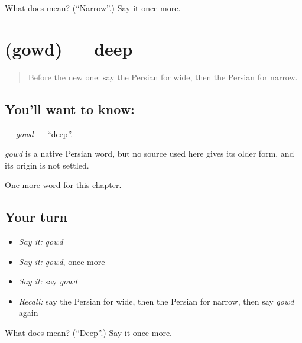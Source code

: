 \begin{tcolorbox}[breakable,colback=teal!4,colframe=teal!35!black,title={Before you move on}]
What does  mean? (\textquotedblleft{}Narrow\textquotedblright{}.) Say it once more.
\end{tcolorbox}
\section[\texorpdfstring{\fa{گود} (gowd)}{گود (gowd)}]{ (gowd) — deep}

\label{lesson:FA-C124-gowd}



\begin{quote}
Before the new one: say the Persian for wide, then the Persian for narrow.
\end{quote}

\subsection*{You'll want to know: }
\textbf{} — \emph{gowd} — \textquotedblleft{}deep\textquotedblright{}.

\begin{cousinweb}
\emph{gowd} is a native Persian word, but no source used here gives its older form, and its origin is not settled.
\end{cousinweb}

\begin{grammarlens}[title={What you've built}]
One more word for this chapter.
\end{grammarlens}

\subsection*{Your turn}
\begin{itemize}
\raggedright
  \item \emph{Say it:} \emph{gowd}
  \item \emph{Say it:} \emph{gowd}, once more
  \item \emph{Say it:} say \emph{gowd}
  \item \emph{Recall:} say the Persian for wide, then the Persian for narrow, then say \emph{gowd} again
\end{itemize}

\begin{tcolorbox}[breakable,colback=teal!4,colframe=teal!35!black,title={Before you move on}]
What does  mean? (\textquotedblleft{}Deep\textquotedblright{}.) Say it once more.
\end{tcolorbox}
